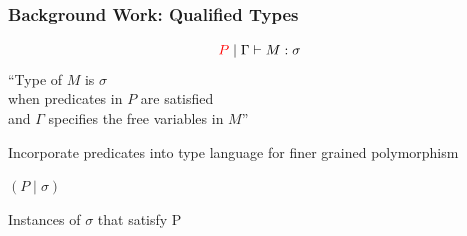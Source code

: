 \begin{frame}[c]
  \frametitle{Background Work: Qualified Types}
  \begin{center}
  {\LARGE   $${\color{red}P} \mid \Gamma \vdash M:\sigma $$}
``Type of $M$ is $\sigma$\\
  when predicates in $P$ are satisfied\\
  and $\Gamma$ specifies the free variables in $M$''\cite{jones_theory_1994}

  Incorporate predicates into type language for finer grained polymorphism



  {\LARGE $(P \mid \sigma)$}

  Instances of $\sigma$ that satisfy P
  \end{center}
\end{frame}





